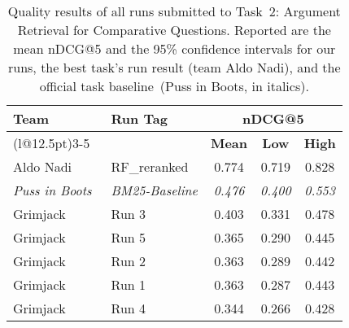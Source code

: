\begin{table}[t]
\centering
\small
\renewcommand{\tabcolsep}{12.5pt}
\caption{Quality results of all runs submitted to Task~2: Argument Retrieval for Comparative Questions. Reported are the mean nDCG@5 and the 95\% confidence intervals for our runs, the best task's run result (team Aldo Nadi), and the official task baseline~(Puss in Boots, in italics).}
\label{table-results-quality}
\begin{tabular}{@{}llccc@{}}
\toprule
\textbf{Team} & \textbf{Run Tag} & \multicolumn{3}{c}{\textbf{nDCG@5}} \\
\cmidrule(l@{\tabcolsep}){3-5}
&  & \textbf{Mean} & \textbf{Low} & \textbf{High} \\
\midrule
Aldo Nadi~\cite{AbaAGMPVF2022} & RF\_reranked & 0.774 & 0.719 & 0.828 \\
\textit{Puss in Boots}~\cite{BondarenkoFKSGBPBSWPH2022} & \textit{BM25-Baseline} & \textit{0.476} & \textit{0.400} & \textit{0.553} \\
Grimjack & Run 3 & 0.403 & 0.331 & 0.478 \\
Grimjack & Run 5 & 0.365 & 0.290 & 0.445 \\
Grimjack & Run 2 & 0.363 & 0.289 & 0.442 \\
Grimjack & Run 1 & 0.363 & 0.287 & 0.443 \\
Grimjack & Run 4 & 0.344 & 0.266 & 0.428 \\
\bottomrule
\end{tabular}
\end{table}